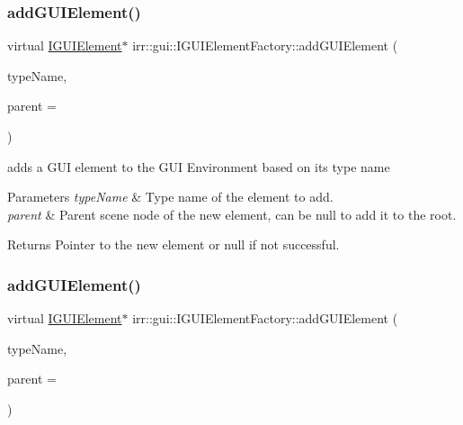 \subsubsection{\texorpdfstring{add\+G\+U\+I\+Element()}{addGUIElement()}\hspace{0.1cm}{\footnotesize\ttfamily [3/4]}}
{\footnotesize\ttfamily virtual \hyperlink{classirr_1_1gui_1_1IGUIElement}{I\+G\+U\+I\+Element}$\ast$ irr\+::gui\+::\+I\+G\+U\+I\+Element\+Factory\+::add\+G\+U\+I\+Element (\begin{DoxyParamCaption}\item[{const \hyperlink{namespaceirr_a9395eaea339bcb546b319e9c96bf7410}{c8} $\ast$}]{type\+Name,  }\item[{\hyperlink{classirr_1_1gui_1_1IGUIElement}{I\+G\+U\+I\+Element} $\ast$}]{parent = {} }\end{DoxyParamCaption})\hspace{0.3cm}{\ttfamily [pure virtual]}}



adds a G\+UI element to the G\+UI Environment based on its type name 


\begin{DoxyParams}{Parameters}
{\em type\+Name} & Type name of the element to add. \\
\hline
{\em parent} & Parent scene node of the new element, can be null to add it to the root. \\
\hline
\end{DoxyParams}
\begin{DoxyReturn}{Returns}
Pointer to the new element or null if not successful. 
\end{DoxyReturn}
\mbox{\label{classirr_1_1gui_1_1IGUIElementFactory_aec55be9ef891ba1b19c5d9c5a85130a4}} 
\subsubsection{\texorpdfstring{add\+G\+U\+I\+Element()}{addGUIElement()}\hspace{0.1cm}{\footnotesize\ttfamily [4/4]}}
{\footnotesize\ttfamily virtual \hyperlink{classirr_1_1gui_1_1IGUIElement}{I\+G\+U\+I\+Element}$\ast$ irr\+::gui\+::\+I\+G\+U\+I\+Element\+Factory\+::add\+G\+U\+I\+Element (\begin{DoxyParamCaption}\item[{const \hyperlink{namespaceirr_a9395eaea339bcb546b319e9c96bf7410}{c8} $\ast$}]{type\+Name,  }\item[{\hyperlink{classirr_1_1gui_1_1IGUIElement}{I\+G\+U\+I\+Element} $\ast$}]{parent = {} }\end{DoxyParamCaption})\hspace{0.3cm}{\ttfamily [pure virtual]}}



